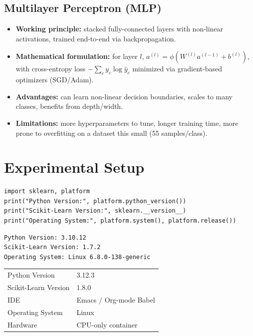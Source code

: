 \documentclass[11pt]{article}
\begin{document}
\subsection{Multilayer Perceptron (MLP)}
\label{sec:orgbea24ee}
\begin{itemize}
\item \textbf{Working principle:} stacked fully-connected layers with non-linear activations, trained
end-to-end via backpropagation.
\item \textbf{Mathematical formulation:} for layer \(l\), \(a^{(l)} = \phi(W^{(l)}a^{(l-1)} + b^{(l)})\),
with cross-entropy loss \(-\sum_c y_c \log \hat{y}_c\) minimized via gradient-based
optimizers (SGD/Adam).
\item \textbf{Advantages:} can learn non-linear decision boundaries, scales to many classes, benefits
from depth/width.
\item \textbf{Limitations:} more hyperparameters to tune, longer training time, more prone to
overfitting on a dataset this small (55 samples/class).
\end{itemize}

\section{Experimental Setup}
\label{sec:orgd7db05a}

\begin{verbatim}
import sklearn, platform
print("Python Version:", platform.python_version())
print("Scikit-Learn Version:", sklearn.__version__)
print("Operating System:", platform.system(), platform.release())
\end{verbatim}

\begin{verbatim}
Python Version: 3.10.12
Scikit-Learn Version: 1.7.2
Operating System: Linux 6.8.0-138-generic
\end{verbatim}


\begin{center}
\begin{tabular}{ll}
\hline
Python Version & 3.12.3\\
Scikit-Learn Version & 1.8.0\\
IDE & Emacs / Org-mode Babel\\
Operating System & Linux\\
Hardware & CPU-only container\\
\hline
\end{tabular}
\end{center}
\end{document}
